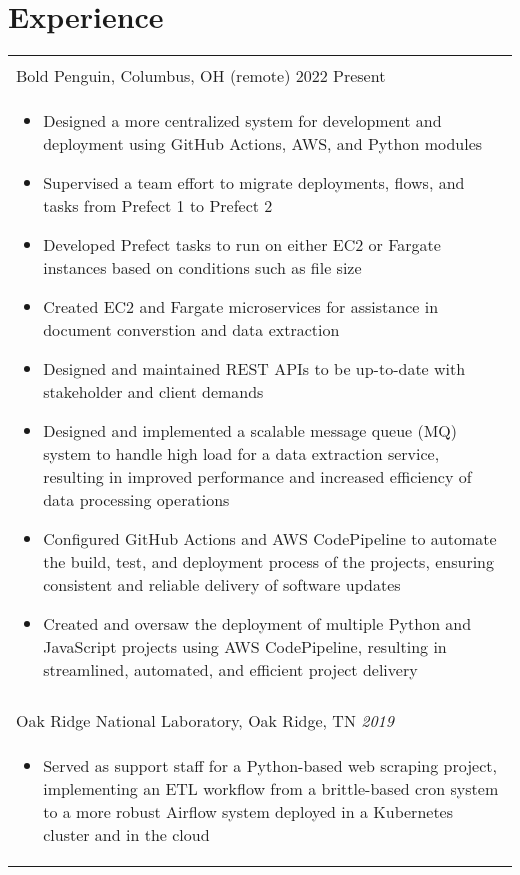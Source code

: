 \documentclass[10pt]{article}%
\begin{document}
\section*{\faCalendar{} Experience}
   \begin{tabularx}{\linewidth}{M}%
      \\
     Bold Penguin, Columbus, OH (remote) 2022\textemdash{} Present \\
     \begin{itemize}[topsep=-12pt,parsep=0em]
         \setlength\itemsep{0em}
         \item Designed a more centralized system for development and deployment using GitHub Actions, AWS, and Python modules %
         \item Supervised a team effort to migrate deployments, flows, and tasks from Prefect 1 to Prefect 2 %
         \item Developed Prefect tasks to run on either EC2 or Fargate instances based on conditions such as file size %
         \item Created EC2 and Fargate microservices for assistance in document converstion and data extraction %
         \item Designed and maintained REST APIs to be up-to-date with stakeholder and client demands %
         \item Designed and implemented a scalable message queue (MQ) system to handle high load for a data extraction service, resulting in improved performance and increased efficiency of data processing operations %
         \item Configured GitHub Actions and AWS CodePipeline to automate the build, test, and deployment process of the projects, ensuring consistent and reliable delivery of software updates %
         \item Created and oversaw the deployment of multiple Python and JavaScript projects using AWS CodePipeline, resulting in streamlined, automated, and efficient project delivery %
     \end{itemize} \\
       \\
      Oak Ridge National Laboratory, Oak Ridge, TN \textit{2019} \\
      \begin{itemize}[topsep=-12pt,parsep=0em]
          \setlength\itemsep{0em}
          \item Served as support staff for a Python-based web scraping project, implementing an ETL workflow from a brittle-based cron system to a more robust Airflow system deployed in a Kubernetes cluster and in the cloud %

\end{itemize}
\end{tabularx}
\end{document}
